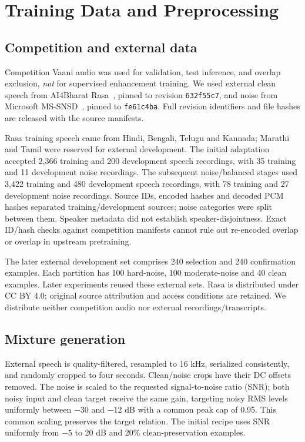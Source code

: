 \documentclass[conference]{IEEEtran}
\begin{document}
\section{Training Data and Preprocessing}
\subsection{Competition and external data}
Competition Vaani audio was used for validation, test inference, and overlap exclusion, \emph{not} for supervised enhancement training. We used external clean speech from AI4Bharat Rasa~\cite{rasa}, pinned to revision \texttt{632f55c7}, and noise from Microsoft MS-SNSD~\cite{snsd}, pinned to \texttt{fe61c4ba}. Full revision identifiers and file hashes are released with the source manifests.

Rasa training speech came from Hindi, Bengali, Telugu and Kannada; Marathi and Tamil were reserved for external development. The initial adaptation accepted 2,366 training and 200 development speech recordings, with 35 training and 11 development noise recordings. The subsequent noise/balanced stages used 3,422 training and 480 development speech recordings, with 78 training and 27 development noise recordings. Source IDs, encoded hashes and decoded PCM hashes separated training/development sources; noise categories were split between them. Speaker metadata did not establish speaker-disjointness. Exact ID/hash checks against competition manifests cannot rule out re-encoded overlap or overlap in upstream pretraining.

The later external development set comprises 240 selection and 240 confirmation examples. Each partition has 100 hard-noise, 100 moderate-noise and 40 clean examples. Later experiments reused these external sets. Rasa is distributed under CC BY 4.0; original source attribution and access conditions are retained. We distribute neither competition audio nor external recordings/transcripts.

\subsection{Mixture generation}
External speech is quality-filtered, resampled to 16 kHz, serialized consistently, and randomly cropped to four seconds. Clean/noise crops have their DC offsets removed. The noise is scaled to the requested signal-to-noise ratio (SNR); both noisy input and clean target receive the same gain, targeting noisy RMS levels uniformly between $-30$ and $-12$ dB with a common peak cap of 0.95. This common scaling preserves the target relation. The initial recipe uses SNR uniformly from $-5$ to 20 dB and 20\% clean-preservation examples.
\end{document}
